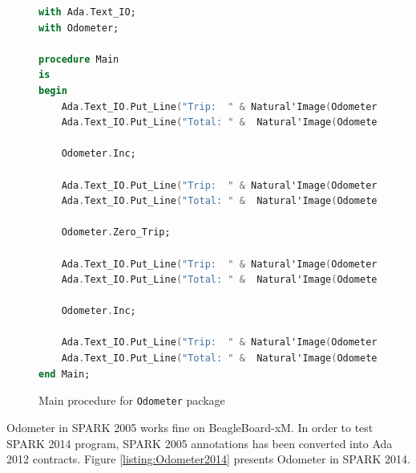 \begin{figure}[ht]
\singlespacing
\begin{lstlisting}[language=ada, frame=single, gobble=0]
with Ada.Text_IO;
with Odometer;

procedure Main
is
begin
    Ada.Text_IO.Put_Line("Trip:  " & Natural'Image(Odometer.Read_Trip));
    Ada.Text_IO.Put_Line("Total: " &  Natural'Image(Odometer.Read_Total));

    Odometer.Inc;

    Ada.Text_IO.Put_Line("Trip:  " & Natural'Image(Odometer.Read_Trip));
    Ada.Text_IO.Put_Line("Total: " &  Natural'Image(Odometer.Read_Total));

    Odometer.Zero_Trip;

    Ada.Text_IO.Put_Line("Trip:  " & Natural'Image(Odometer.Read_Trip));
    Ada.Text_IO.Put_Line("Total: " &  Natural'Image(Odometer.Read_Total));

    Odometer.Inc;

    Ada.Text_IO.Put_Line("Trip:  " & Natural'Image(Odometer.Read_Trip));
    Ada.Text_IO.Put_Line("Total: " &  Natural'Image(Odometer.Read_Total));
end Main;
\end{lstlisting} 
\doublespacing
\caption{Main procedure for \lstinline{Odometer} package}
\label{listing:main}
\end{figure}

Odometer in SPARK 2005 works fine on BeagleBoard-xM. In order to test SPARK 2014 program, SPARK 2005 annotations has been converted into Ada 2012 contracts. Figure \ref{listing:Odometer2014} presents Odometer in SPARK 2014.

